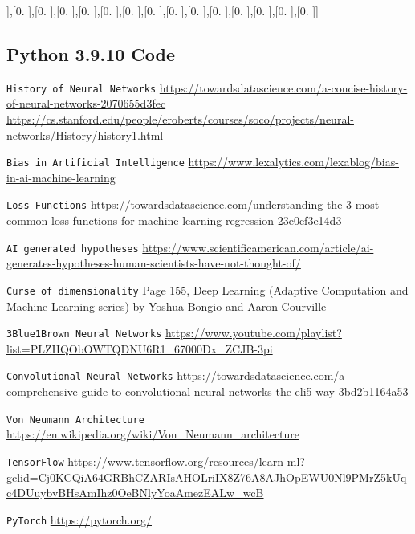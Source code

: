 \documentclass[titlepage]{article}
\begin{document}
     ],[0.        ],[0.        ],[0.        ],[0.        ],[0.        ],[0.        ],[0.        ],[0.        ],[0.        ],[0.        ],[0.        ],[0.        ],[0.        ],[0.        ]]

\subsection{Python 3.9.10 Code}


\begin{thebibliography}{9}
    \texttt{History of Neural Networks}
    \url{https://towardsdatascience.com/a-concise-history-of-neural-networks-2070655d3fec}
    \url{https://cs.stanford.edu/people/eroberts/courses/soco/projects/neural-networks/History/history1.html}
   
    \texttt{Bias in Artificial Intelligence}
    \url{https://www.lexalytics.com/lexablog/bias-in-ai-machine-learning}

    \texttt{Loss Functions}
    \url{https://towardsdatascience.com/understanding-the-3-most-common-loss-functions-for-machine-learning-regression-23e0ef3e14d3}

    \texttt{AI generated hypotheses}
    \url{https://www.scientificamerican.com/article/ai-generates-hypotheses-human-scientists-have-not-thought-of/}

    \texttt{Curse of dimensionality}
    Page 155, Deep Learning (Adaptive Computation and Machine Learning series) by Yoshua Bongio and Aaron Courville

    \texttt{3Blue1Brown Neural Networks}
    \url{https://www.youtube.com/playlist?list=PLZHQObOWTQDNU6R1_67000Dx_ZCJB-3pi}

    \texttt{Convolutional Neural Networks}
    \url{https://towardsdatascience.com/a-comprehensive-guide-to-convolutional-neural-networks-the-eli5-way-3bd2b1164a53}

    \texttt{Von Neumann Architecture}
    \url{https://en.wikipedia.org/wiki/Von_Neumann_architecture}

    \texttt{TensorFlow}
    \url{https://www.tensorflow.org/resources/learn-ml?gclid=Cj0KCQiA64GRBhCZARIsAHOLriIX8Z76A8AJhOpEWU0Nl9PMrZ5kUqc4DUuybvBHsAmIhz0OeBNlyYoaAmezEALw_wcB}

    \texttt{PyTorch}
    \url{https://pytorch.org/}
\end{thebibliography}
\end{document}
